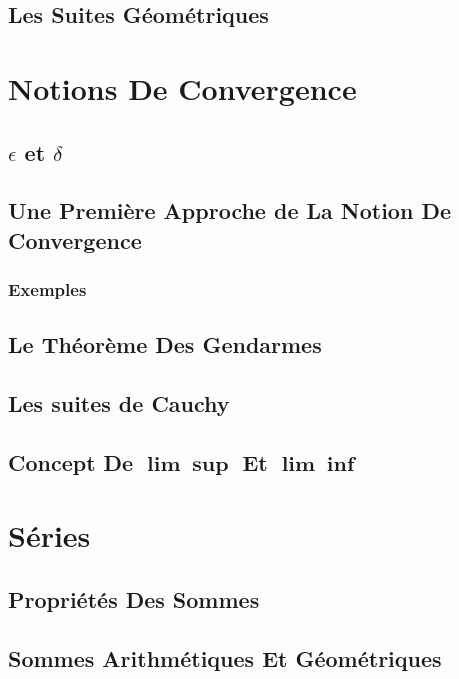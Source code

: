 \documentclass[11pt]{report}
\begin{document}
\section{Les Suites Géométriques}
\lipsum[1]

\lipsum[1]
\chapter{Notions De Convergence}
\section{$\epsilon$ et $\delta$}
\lipsum[1]
\section{Une Première Approche de La Notion De Convergence}
\lipsum[1]
\subsection{Exemples}
\lipsum[1]
\section{Le Théorème Des Gendarmes}
\lipsum[1]
\section{Les suites de Cauchy}
\lipsum[1]
\section{Concept De $\mathbf{\lim \sup}$ Et $\mathbf{\lim \inf}$}
\lipsum[1]
\chapter{Séries}
\section{Propriétés Des Sommes}
\lipsum[1]
\section{Sommes Arithmétiques Et Géométriques}
\lipsum[1]
\end{document}
